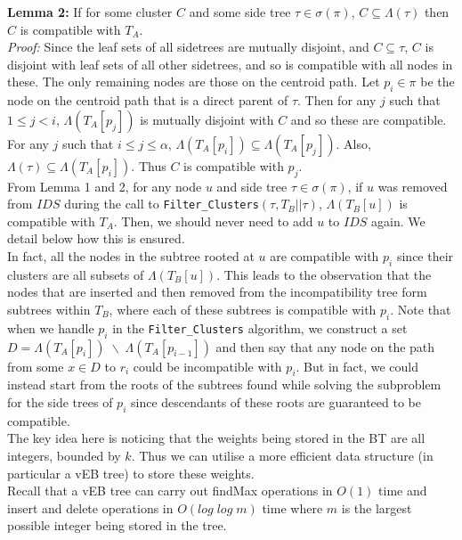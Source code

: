 \documentclass[a4paper]{article}
\begin{document}
    \textbf{Lemma 2:} If for some cluster $C$ and some side tree $\tau \in \sigma(\pi)$, $C \subseteq \Lambda(\tau)$ then $C$ is compatible with $T_A$.\\
    \textit{Proof:} Since the leaf sets of all sidetrees are mutually disjoint, and $C \subseteq \tau$, $C$ is disjoint with leaf sets of all other sidetrees, and so is compatible with all nodes in these. The only remaining nodes are those on the centroid path. Let $p_i \in \pi$ be the node on the centroid path that is a direct parent of $\tau$. Then for any $j$ such that $1 \leq j < i$, $\Lambda(T_A[p_j])$ is mutually disjoint with $C$ and so these are compatible. For any $j$ such that $i \leq j \leq \alpha$, $\Lambda(T_A[p_i]) \subseteq \Lambda(T_A[p_j])$. Also, $\Lambda(\tau) \subseteq \Lambda(T_A[p_i])$. Thus $C$ is compatible with $p_j$.\\

    From Lemma 1 and 2, for any node $u$ and side tree $\tau \in \sigma(\pi)$, if $u$ was removed from $IDS$ during the call to \texttt{Filter\_Clusters}$(\tau, T_B||\tau)$, $\Lambda(T_B[u])$ is compatible with $T_A$. Then, we should never need to add $u$ to $IDS$ again. We detail below how this is ensured.\\

    In fact, all the nodes in the subtree rooted at $u$ are compatible with $p_i$ since their clusters are all subsets of $\Lambda(T_B[u])$. This leads to the observation that the nodes that are inserted and then removed from the incompatibility tree form subtrees within $T_B$, where each of these subtrees is compatible with $p_i$. Note that when we handle $p_i$ in the \texttt{Filter\_Clusters} algorithm, we construct a set $D = \Lambda(T_A[p_i]) \;\backslash\; \Lambda(T_A[p_{i-1}])$ and then say that any node on the path from some $x \in D$ to $r_i$ could be incompatible with $p_i$. But in fact, we could instead start from the roots of the subtrees found while solving the subproblem for the side trees of $p_i$ since descendants of these roots are guaranteed to be compatible.\\

    The key idea here is noticing that the weights being stored in the BT are all integers, bounded by $k$. Thus we can utilise a more efficient data structure (in particular a vEB tree) to store these weights.\\

    Recall that a vEB tree can carry out findMax operations in $O(1)$ time and insert and delete operations in $O(log\;log\;m)$ time where $m$ is the largest possible integer being stored in the tree.\\
\end{document}
